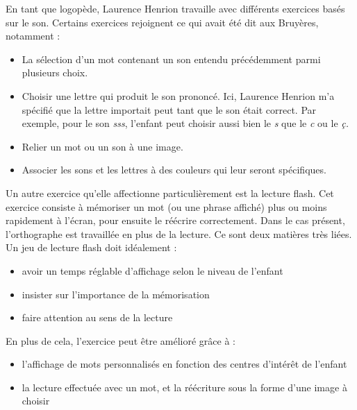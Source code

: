 En tant que logopède, Laurence Henrion travaille avec différents exercices basés sur le son. Certains exercices rejoignent ce qui avait été dit aux Bruyères, notamment :
\begin{itemize}
\item La sélection d'un mot contenant un son entendu précédemment parmi plusieurs choix.
\item Choisir une lettre qui produit le son prononcé. Ici, Laurence Henrion m'a spécifié que la lettre importait peut tant que le son était correct. Par exemple, pour le son \textit{sss}, l'enfant peut choisir aussi bien le \textit{s} que le \textit{c} ou le \textit{ç.}
\item Relier un mot ou un son à une image.
\item Associer les sons et les lettres à des couleurs qui leur seront spécifiques.\\
\end{itemize}

Un autre exercice qu'elle affectionne particulièrement est la lecture flash.
Cet exercice consiste à mémoriser un mot (ou une phrase affiché) plus ou moins rapidement à l'écran, pour ensuite le réécrire correctement. Dans le cas présent, l'orthographe est travaillée en plus de la lecture. Ce sont deux matières très liées. Un jeu de lecture flash doit idéalement :
\begin{itemize}
\item avoir un temps réglable d'affichage selon le niveau de l'enfant
\item insister sur l'importance de la mémorisation
\item faire attention au sens de la lecture
\end{itemize}
En plus de cela, l'exercice peut être amélioré grâce à :
\begin{itemize}
\item l'affichage de mots personnalisés en fonction des centres d'intérêt de l'enfant
\item la lecture effectuée avec un mot, et la réécriture sous la forme d'une image à choisir\\
\end{itemize}

